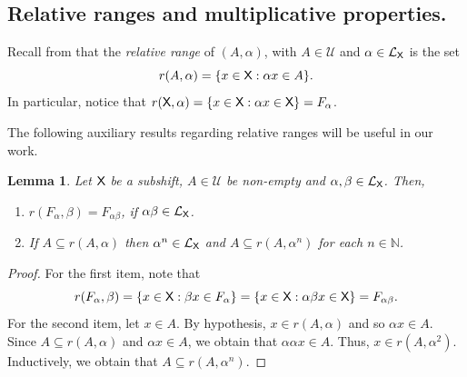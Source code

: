 \documentclass[a4paper,12pt]{amsart}
\newtheorem{lemma}[equation]{Lemma}
\theoremstyle{definition}
\theoremstyle{remark}
\numberwithin{equation}{section}
\newcommand{\osf}{{\normalfont \textsf{X}}}
\newcommand{\lang}{\CL_{\osf}}
\newcommand{\udalgshift}{\TCD_R(\osf)}
\newcommand{\N}{\mathbb{N}}
\newcommand{\F}{\mathbb{F}}
\newcommand{\CD}{\mathcal{D}}
\newcommand{\CL}{\mathcal{L}}
\newcommand{\TCB}{\mathcal{U}}
\newcommand{\TCD}{\widetilde{\CD}}
\newcommand{\eword}{\omega}
\begin{document}

\subsection{Relative ranges and multiplicative properties.}

Recall from \cite{BGGV} that the \emph{relative range} of $(A,\alpha)$, with $A\in \TCB$ and $\alpha \in \lang$ is the set $$r(A,\alpha)=\{x\in \osf:\alpha x\in A\}.$$ In particular, notice that $r(\osf,\alpha)=\{x\in \osf:\alpha x\in \osf\}=F_{\alpha}$. 

The following auxiliary results regarding relative ranges will be useful in our work.

\begin{lemma}\label{relative range} Let $\osf$ be a subshift, $A\in \TCB$ be non-empty and $\alpha, \beta \in \lang$. Then,
\begin{enumerate}
[\hspace{.3cm} \rm (1)]
\item $r(F_\alpha, \beta)=F_{\alpha\beta}$, if $\alpha \beta \in \lang$. 
\item If $A\subseteq r(A,\alpha)$ then $\alpha^n \in \lang$ and $A\subseteq r(A,\alpha^n)$ for each $n\in \N$.
\end{enumerate}   
\end{lemma}
\begin{proof}
For the first item, note that
$$r(F_\alpha, \beta)=\{x\in \osf: \beta x\in F_\alpha\}=\{x\in \osf: \alpha \beta x\in \osf\}=F_{\alpha \beta}.$$
For the second item, let $x\in A$. By hypothesis, $x\in r(A,\alpha)$ and so $\alpha x\in A$. Since $A\subseteq r(A,\alpha)$ and $\alpha x\in A$, we obtain that $\alpha \alpha x \in A$. Thus, $x\in r(A, \alpha^2)$. Inductively, we obtain that $A\subseteq r(A,\alpha^n)$.
\end{proof}
\end{document}
